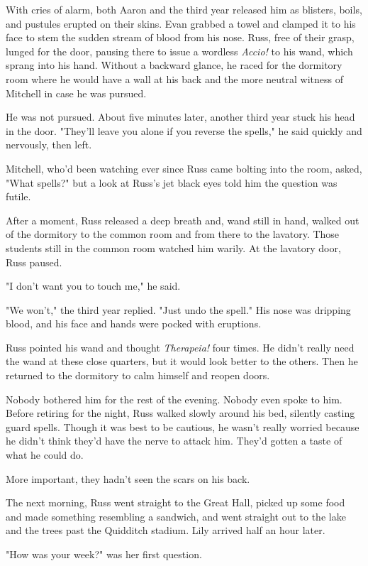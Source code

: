 \documentclass[a4paper,11pt]{article}
\begin{document}
With cries of alarm, both Aaron and the third year released him as blisters, boils, and pustules erupted on their skins. Evan grabbed a towel and clamped it to his face to stem the sudden stream of blood from his nose. Russ, free of their grasp, lunged for the door, pausing there to issue a wordless \emph{Accio!} to his wand, which sprang into his hand. Without a backward glance, he raced for the dormitory room where he would have a wall at his back and the more neutral witness of Mitchell in case he was pursued.

He was not pursued. About five minutes later, another third year stuck his head in the door. "They'll leave you alone if you reverse the spells," he said quickly and nervously, then left.

Mitchell, who'd been watching ever since Russ came bolting into the room, asked, "What spells?" but a look at Russ's jet black eyes told him the question was futile.

After a moment, Russ released a deep breath and, wand still in hand, walked out of the dormitory to the common room and from there to the lavatory. Those students still in the common room watched him warily. At the lavatory door, Russ paused.

"I don't want you to touch me," he said.

"We won't," the third year replied. "Just undo the spell." His nose was dripping blood, and his face and hands were pocked with eruptions.

Russ pointed his wand and thought \emph{Therapeia!} four times. He didn't really need the wand at these close quarters, but it would look better to the others. Then he returned to the dormitory to calm himself and reopen doors.

Nobody bothered him for the rest of the evening. Nobody even spoke to him. Before retiring for the night, Russ walked slowly around his bed, silently casting guard spells. Though it was best to be cautious, he wasn't really worried because he didn't think they'd have the nerve to attack him. They'd gotten a taste of what he could do.

More important, they hadn't seen the scars on his back.

The next morning, Russ went straight to the Great Hall, picked up some food and made something resembling a sandwich, and went straight out to the lake and the trees past the Quidditch stadium. Lily arrived half an hour later.

"How was your week?" was her first question.
\end{document}
